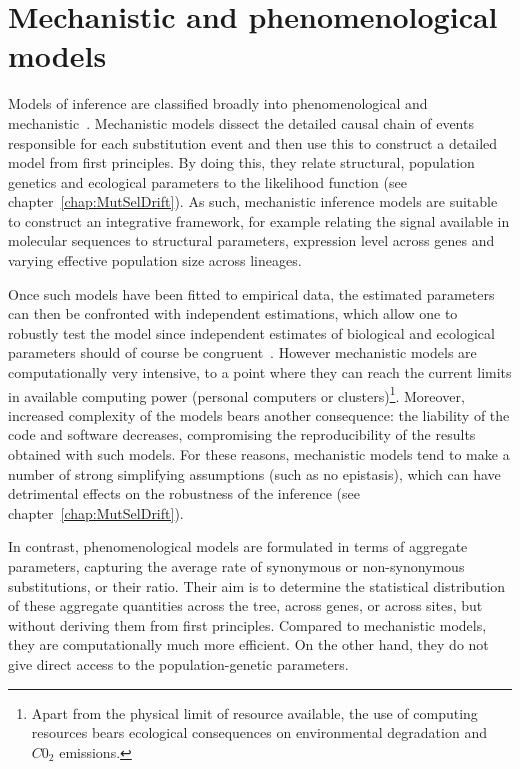 \section{Mechanistic and phenomenological models}
\label{sec:mechanistic-and-phenomenological-models}

Models of inference are classified broadly into phenomenological and mechanistic~\citep{Rodrigue2010a}.
Mechanistic models dissect the detailed causal chain of events responsible for each \gls{substitution} event and then use this to construct a detailed model from first principles.
By doing this, they relate structural, population genetics and ecological parameters to the \gls{likelihood} function (see chapter~\ref{chap:MutSelDrift}).
As such, mechanistic inference models are suitable to construct an integrative framework, for example relating the signal available in molecular sequences to structural parameters, expression level across genes and varying \gls{effective population size} across lineages.

Once such models have been fitted to empirical data, the estimated parameters can then be confronted with independent estimations, which allow one to robustly test the model since independent estimates of biological and ecological parameters should of course be congruent~\citep{Dasmeh2014}.
However mechanistic models are computationally very intensive, to a point where they can reach the current limits in available computing power (personal computers or clusters)\footnote{Apart from the physical limit of resource available, the use of computing resources bears ecological consequences on environmental degradation and $C0_2$ emissions.}.
Moreover, increased complexity of the models bears another consequence: the liability of the code and software decreases, compromising the reproducibility of the results obtained with such models.
For these reasons, mechanistic models tend to make a number of strong simplifying assumptions (such as no epistasis), which can have detrimental effects on the robustness of the inference (see chapter~\ref{chap:MutSelDrift}).

In contrast, phenomenological models are formulated in terms of aggregate parameters, capturing the average rate of \gls{synonymous} or \gls{non-synonymous} \glspl{substitution}, or their ratio.
Their aim is to determine the statistical distribution of these aggregate quantities across the tree, across genes, or across sites, but without deriving them from first principles.
Compared to mechanistic models, they are computationally much more efficient.
On the other hand, they do not give direct access to the population-genetic parameters.


